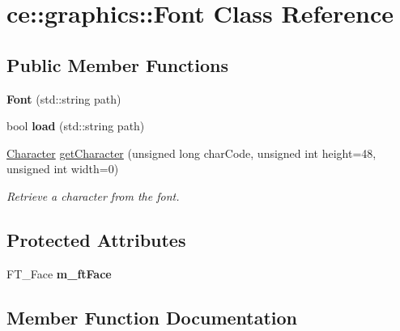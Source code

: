 \hypertarget{classce_1_1graphics_1_1_font}{}\section{ce\+:\+:graphics\+:\+:Font Class Reference}
\label{classce_1_1graphics_1_1_font}
\subsection*{Public Member Functions}
\begin{DoxyCompactItemize}
\item 
\mbox{\label{classce_1_1graphics_1_1_font_ae6c746d596ba69ab989bf083aea235a8}} 
{\bfseries Font} (std\+::string path)
\item 
\mbox{\label{classce_1_1graphics_1_1_font_ab8fce3029f631939c54c9a6e05864e1f}} 
bool {\bfseries load} (std\+::string path)
\item 
\hyperlink{structce_1_1graphics_1_1_character}{Character} \hyperlink{classce_1_1graphics_1_1_font_a44ef17f6322eae8cd5fa1d2ceea86ad1}{get\+Character} (unsigned long char\+Code, unsigned int height=48, unsigned int width=0)
\begin{DoxyCompactList}\small\item\em Retrieve a character from the font. \end{DoxyCompactList}\end{DoxyCompactItemize}
\subsection*{Protected Attributes}
\begin{DoxyCompactItemize}
\item 
\mbox{\label{classce_1_1graphics_1_1_font_a74867445b0dabfed45454e5706bae25c}} 
F\+T\+\_\+\+Face {\bfseries m\+\_\+ft\+Face}
\end{DoxyCompactItemize}


\subsection{Member Function Documentation}
\mbox{\label{classce_1_1graphics_1_1_font_a44ef17f6322eae8cd5fa1d2ceea86ad1}} 
